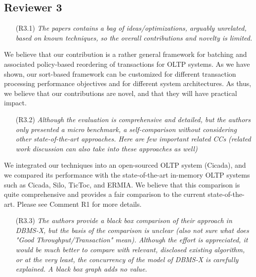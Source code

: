 \documentclass{article}
\newcommand{\todo}[1]{}
\newcommand{\changed}[1]{#1}
\newcommand{\todo}[1]{\textcolor{red}{\bf [TODO!: #1]}}
\newcommand{\changed}[1]{{\color{blue}#1}}
\begin{document}
\subsection{Reviewer 3}

\begin{itemize}
\item[(R3.1)] \emph{The papers contains a bag of ideas/optimizations, arguably unrelated,
	based on known techniques, so the overall contributions and novelty is
	limited.}
\end{itemize}

\changed{
	We believe that our contribution is a rather general framework for batching and associated policy-based reordering of transactions for OLTP systems. As we have shown, our sort-based framework can be customized for different transaction processing performance objectives and for different system architectures. As thus, we believe that our contributions are novel, and that they will have practical impact.
}

\begin{itemize}
\item[(R3.2)] \emph{Although the evaluation is comprehensive and detailed, but the authors
	only presented a micro benchmark, a self-comparison without considering
	other state-of-the-art approaches. Here are few important related CCs
	(related work discussion can also take into these approaches as well)}
\end{itemize}

\changed{
	 We integrated our techniques into an open-sourced OLTP system (Cicada), and we compared its performance with the state-of-the-art in-memory OLTP systems such as Cicada, Silo, TicToc, and ERMIA. We believe that this comparison is quite comprehensive and provides a fair comparison to the current state-of-the-art. Please see Comment R1 for more details.
}

\begin{itemize}
\item[(R3.3)] \emph{The authors provide a black box comparison of their approach in DBMS-X,
	but the basis of the comparison is unclear (also not sure what does
	"Good Throughput/Transaction" mean). Although the effort is appreciated,
	it would be much better to compare with relevant, disclosed existing
	algorithm, or at the very least, the concurrency of the model of DBMS-X is
	carefully explained. A black box graph adds no value.}
\end{itemize}
\end{document}
